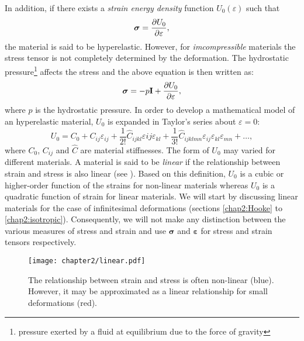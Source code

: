 \ON In addition, \OFF if there exists a \emph{strain energy density} function $U_0(\varepsilon)$ such that 
\begin{equation}
\label{chap2:energy}
\boldsymbol \sigma = \dfrac{\partial U_0}{\partial \varepsilon},
\end{equation}
\ON the material is said to be hyperelastic. \OFF However, for \emph{imcompressible} materials the stress tensor is not completely determined by the deformation. The hydrostatic pressure\footnote{pressure exerted by a fluid at equilibrium due to the force of gravity} affects the stress and the above equation is then written as:
\begin{equation}
\label{chap2:energy2}
\boldsymbol \sigma = -p \mathbf{I} + \dfrac{\partial U_0}{\partial \varepsilon},
\end{equation}
where $p$ is the hydrostatic pressure. In order to develop a mathematical model of an hyperelastic material, $U_0$ is expanded in Taylor's series about $\varepsilon = 0$:
\begin{equation}
U_0 = C_0 + C_{ij}\varepsilon_{ij} + \frac{1}{2!}\hat{C}_{ijkl}\varepsilon{ij}\varepsilon_{kl} + \frac{1}{3!}\hat{C}_{ijklmn}\varepsilon_{ij}\varepsilon_{kl}\varepsilon_{mn} + \ldots , 
\end{equation}
where $C_0$, $C_{ij}$ and $\hat{C}$ are material stiffnesses. The form of $U_0$ may varied for different materials. A material is said to be \emph{linear} if the relationship between strain and stress is also linear (see ). Based on this definition, $U_0$ is a cubic or higher-order function of the strains for non-linear materials whereas $U_0$ is a quadratic function of strain for linear materials. We will start by discussing linear materials for the case of infinitesimal deformations (sections \ref{chap2:Hooke} to \ref{chap2:isotropic}). Consequently, we will not make any distinction between the various measures of stress and strain and use $\boldsymbol \sigma$ and $\boldsymbol \varepsilon$ for stress and strain tensors respectively. 
%
\begin{figure}[ht]
\centering
\texttt{[image: chapter2/linear.pdf]}
\caption {The relationship between strain and stress is often non-linear (blue). However, it may be approximated as a linear relationship for small deformations (red). }
\label{chap2:fig-linear}
\end{figure}

	
